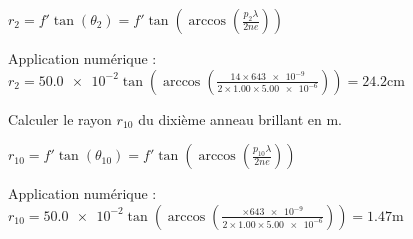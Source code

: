				
\begin{corrige}
	$r_2=f' \tan(\theta_2)=f' \tan\left(\arccos\left( \frac{p_2 \lambda}{2ne}\right)\right)$

	Application numérique : $r_2=\num{50.0e-2}\tan\left(\arccos\left( \frac{14 \times \num{643e-9}}{2 \times \num{1.00} \times \num{5.00e-6}}\right)\right)=\num{24.2}\si{\centi\metre}$
\end{corrige}
				


\begin{enonce}
Calculer le rayon $r_{10}$ du dixième anneau brillant en $\si{\metre}$.
\end{enonce}
					
					
\begin{corrige}
	$r_{10}=f' \tan(\theta_{10})=f' \tan\left(\arccos\left( \frac{p_{10} \lambda}{2ne}\right)\right)$

	Application numérique : $r_{10}=\num{50.0e-2}\tan\left(\arccos\left( \frac{ \times \num{643e-9}}{2 \times \num{1.00} \times \num{5.00e-6}}\right)\right)=\num{1.47}\si{\metre}$
\end{corrige}
					

\finEntrainement









